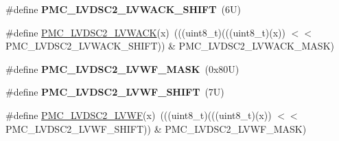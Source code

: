 \begin{DoxyCompactItemize}
\item 
\mbox{\label{group___p_m_c___register___masks_ga99ad1d373a7be7591a7ee3577bed5374}} 
\#define {\bfseries P\+M\+C\+\_\+\+L\+V\+D\+S\+C2\+\_\+\+L\+V\+W\+A\+C\+K\+\_\+\+S\+H\+I\+FT}~(6\+U)
\item 
\#define \mbox{\hyperlink{group___p_m_c___register___masks_ga487c1af0f694e53be64251c1862e8d9c}{P\+M\+C\+\_\+\+L\+V\+D\+S\+C2\+\_\+\+L\+V\+W\+A\+CK}}(x)~(((uint8\+\_\+t)(((uint8\+\_\+t)(x)) $<$$<$ P\+M\+C\+\_\+\+L\+V\+D\+S\+C2\+\_\+\+L\+V\+W\+A\+C\+K\+\_\+\+S\+H\+I\+FT)) \& P\+M\+C\+\_\+\+L\+V\+D\+S\+C2\+\_\+\+L\+V\+W\+A\+C\+K\+\_\+\+M\+A\+SK)
\item 
\mbox{\label{group___p_m_c___register___masks_ga34187b0598a3e166a457818770a616d4}} 
\#define {\bfseries P\+M\+C\+\_\+\+L\+V\+D\+S\+C2\+\_\+\+L\+V\+W\+F\+\_\+\+M\+A\+SK}~(0x80\+U)
\item 
\mbox{\label{group___p_m_c___register___masks_ga8bcfb9fc5fd4a92164b2aa6cdb6db77e}} 
\#define {\bfseries P\+M\+C\+\_\+\+L\+V\+D\+S\+C2\+\_\+\+L\+V\+W\+F\+\_\+\+S\+H\+I\+FT}~(7\+U)
\item 
\#define \mbox{\hyperlink{group___p_m_c___register___masks_ga674f52d0325d911bf7dd91bf47b708f4}{P\+M\+C\+\_\+\+L\+V\+D\+S\+C2\+\_\+\+L\+V\+WF}}(x)~(((uint8\+\_\+t)(((uint8\+\_\+t)(x)) $<$$<$ P\+M\+C\+\_\+\+L\+V\+D\+S\+C2\+\_\+\+L\+V\+W\+F\+\_\+\+S\+H\+I\+FT)) \& P\+M\+C\+\_\+\+L\+V\+D\+S\+C2\+\_\+\+L\+V\+W\+F\+\_\+\+M\+A\+SK)
\end{DoxyCompactItemize}
